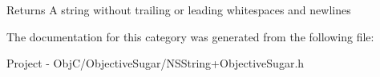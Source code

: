 \begin{DoxyReturn}{Returns}
A string without trailing or leading whitespaces and newlines 
\end{DoxyReturn}


The documentation for this category was generated from the following file\+:\begin{DoxyCompactItemize}
\item 
Project -\/ Obj\+C/\+Objective\+Sugar/N\+S\+String+\+Objective\+Sugar.\+h\end{DoxyCompactItemize}
